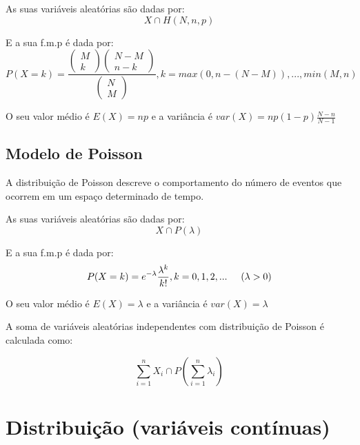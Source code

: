 \documentclass[10pt,a4paper]{report}
\begin{document}
As suas variáveis aleatórias s\~ao dadas por:\\

$$
X \cap H(N, n, p)
$$

E a sua f.m.p é dada por:\\

$$
P(X = k) = \frac{\begin{pmatrix}
M\\
k
\end{pmatrix}\begin{pmatrix}
N-M\\
n-k
\end{pmatrix}}{\begin{pmatrix}
N\\
M
\end{pmatrix}}
, k = max(0, n-(N-M)),..., min(M,n)
$$

\vspace{0.7cm}

O seu valor médio é $E(X)=np$ e a variância é $var(X)=np(1-p)\frac{N-n}{N-1}$

\subsection{Modelo de Poisson}
A distribuição de Poisson descreve o comportamento do número de eventos que ocorrem em um espaço determinado de tempo.

As suas variáveis aleatórias s\~ao dadas por:\\

$$
X \cap P(\lambda)
$$

E a sua f.m.p é dada por:\\

$$
P(X = k) = e^{-\lambda}\frac{\lambda^k}{k!}
, k = 0, 1, 2, ... \hspace{0.5cm} (\lambda > 0)
$$

\vspace{0.7cm}

O seu valor médio é $E(X)=\lambda$ e a variância é $var(X)=\lambda$

\vspace{0.7cm}

A soma de variáveis aleatórias independentes com distribuiç\~ao de Poisson  é calculada como:

$$
\sum_{i=1}^{n} X_i \cap P\left(\sum_{i=1}^{n} \lambda_i\right)
$$

\section{Distribuiç\~ao (variáveis contínuas)}
\end{document}
